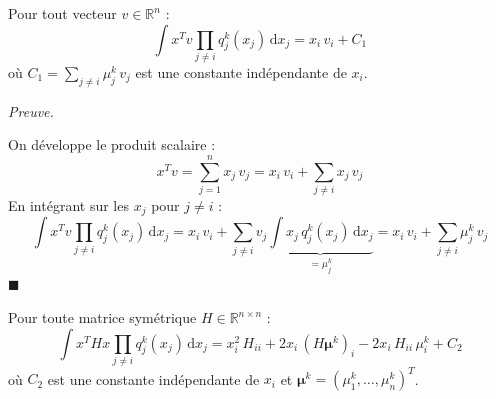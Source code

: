 \documentclass[12pt]{article}
\renewcommand{\qedsymbol}{$\blacksquare$}
\renewenvironment{proof}[1][\proofname]{%
  \par\medskip\noindent
  \textit{\color{proofgray}#1.}\enspace\ignorespaces
}{\hfill\qedsymbol\par\medskip}
\renewcommand{\proofname}{Preuve}
\begin{document}
\begin{resultbox}
\label{prop:linear_integral}
Pour tout vecteur $v \in \mathbb{R}^n$ :
\begin{equation}
    \int x^T v \prod_{j \neq i} q_j^k(x_j)\, \mathrm{d}x_j = x_i\, v_i + C_1
    \label{eq:linear_trick}
\end{equation}
où $C_1 = \sum_{j \neq i} \mu_j^k\, v_j$ est une constante indépendante de $x_i$.
\end{resultbox}

\begin{proof}

On développe le produit scalaire :
\[
x^T v = \sum_{j=1}^n x_j\, v_j = x_i\, v_i + \sum_{j \neq i} x_j\, v_j
\]
En intégrant sur les $x_j$ pour $j \neq i$ :
\[
\int x^T v \prod_{j \neq i} q_j^k(x_j)\, \mathrm{d}x_j = x_i\, v_i + \sum_{j \neq i} v_j \underbrace{\int x_j\, q_j^k(x_j)\, \mathrm{d}x_j}_{= \mu_j^k} = x_i\, v_i + \sum_{j \neq i} \mu_j^k\, v_j
\]
\end{proof}

\begin{resultbox}
\label{prop:quadratic_integral}
Pour toute matrice symétrique $H \in \mathbb{R}^{n \times n}$ :
\begin{equation}
    \boxed{\int x^T H x \prod_{j \neq i} q_j^k(x_j)\, \mathrm{d}x_j = x_i^2\, H_{ii} + 2x_i\, (H\boldsymbol{\mu}^k)_i - 2x_i\, H_{ii}\, \mu_i^k + C_2}
    \label{eq:quadratic_trick}
\end{equation}
où $C_2$ est une constante indépendante de $x_i$ et $\boldsymbol{\mu}^k = (\mu_1^k, \ldots, \mu_n^k)^T$.
\end{resultbox}
\end{document}
